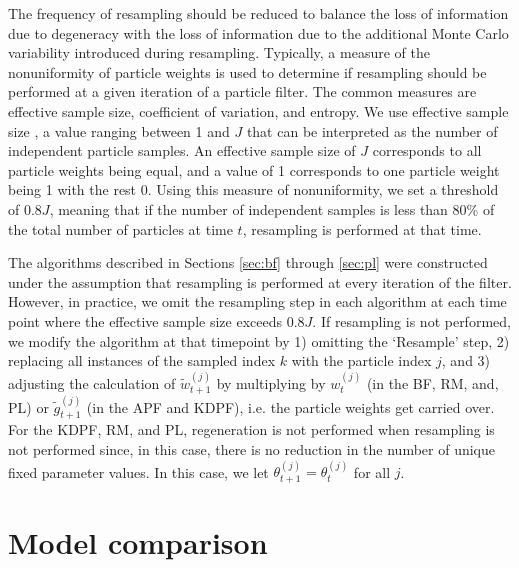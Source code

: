 The frequency of resampling should be reduced to balance the loss of information due to degeneracy with the loss of information due to the additional Monte Carlo variability introduced during resampling. Typically, a measure of the nonuniformity of particle weights is used to determine if resampling should be performed at a given iteration of a particle filter. The common measures are effective sample size, coefficient of variation, and entropy. We use effective sample size \citep{Liu:Chen:Wong:reje:1998}, a value ranging between 1 and $J$ that can be interpreted as the number of independent particle samples. An effective sample size of $J$ corresponds to all particle weights being equal, and a value of 1 corresponds to one particle weight being 1 with the rest 0. Using this measure of nonuniformity, we set a threshold of $0.8J$, meaning that if the number of independent samples is less than 80\% of the total number of particles at time $t$, resampling is performed at that time.

The algorithms described in Sections \ref{sec:bf} through \ref{sec:pl} were constructed under the assumption that resampling is performed at every iteration of the filter. However, in practice, we omit the resampling step in each algorithm at each time point where the effective sample size exceeds $0.8J$. If resampling is not performed, we modify the algorithm at that timepoint by 1) omitting the `Resample' step, 2) replacing all instances of the sampled index $k$ with the particle index $j$, and 3) adjusting the calculation of $\tilde{w}_{t+1}^{(j)}$ by multiplying by $w_t^{(j)}$ (in the BF, RM, and, PL) or $\tilde{g}^{(j)}_{t+1}$ (in the APF and KDPF), i.e. the particle weights get carried over. For the KDPF, RM, and PL, regeneration is not performed when resampling is not performed since, in this case, there is no reduction in the number of unique fixed parameter values. In this case, we let $\theta_{t+1}^{(j)} = \theta_t^{(j)}$ for all $j$.

\section{Model comparison \label{sec:comp}}

